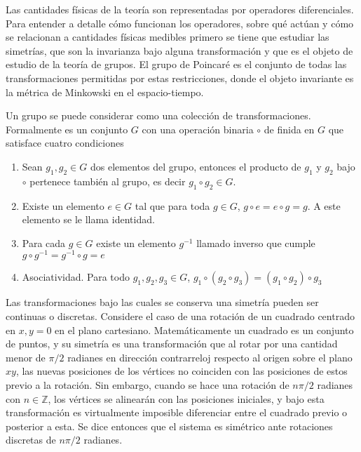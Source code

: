 Las cantidades físicas de la teoría son representadas por operadores diferenciales. Para entender a detalle cómo funcionan los operadores, sobre qué actúan y cómo se relacionan a cantidades físicas medibles primero se tiene que estudiar las simetrías, que son la invarianza bajo alguna transformación y que es el objeto de estudio de la teoría de grupos. El grupo de Poincaré es el conjunto de todas las transformaciones permitidas por estas restricciones, donde el objeto invariante es la métrica de Minkowski en el espacio-tiempo.

Un grupo se puede considerar como una colección de transformaciones. Formalmente es un conjunto $G$ con una operación binaria $\circ$ de finida en $G$ que satisface cuatro condiciones
\begin{enumerate}
  \item Sean $g_1,g_2 \in G$ dos elementos del grupo, entonces el producto de $g_1$ y $g_2$ bajo $\circ$ pertenece también al grupo, es decir $g_1 \circ g_2 \in G$.
  \item Existe un elemento $e\in G$ tal que para toda $g\in G$, $g\circ e = e\circ g = g$. A este elemento se le llama identidad.
  \item Para cada $g\in G$ existe un elemento $g^{-1}$ llamado inverso que cumple $g\circ g^{-1} = g^{-1}\circ g =e$
  \item Asociatividad. Para todo $g_1, g_2, g_3 \in G$, $g_1 \circ (g_2 \circ g_3) = (g_1 \circ g_2) \circ g_3$
\end{enumerate}
Las transformaciones bajo las cuales se conserva una simetría pueden ser continuas o discretas. Considere el caso de una rotación de un cuadrado centrado en $x,y=0$ en el plano cartesiano. Matemáticamente un cuadrado es un conjunto de puntos, y su simetría es una transformación que al rotar por una cantidad menor de $\pi/2$ radianes en dirección contrarreloj respecto al origen sobre el plano $xy$, las nuevas posiciones de los vértices no coinciden con las posiciones de estos previo a la rotación. Sin embargo, cuando se hace una rotación de $n\pi/2$ radianes con $n\in \mathbb{Z}$, los vértices se alinearán con las posiciones iniciales, y bajo esta transformación es virtualmente imposible diferenciar entre el cuadrado previo o posterior a esta. Se dice entonces que el sistema es simétrico ante rotaciones discretas de $n\pi/2$ radianes.

